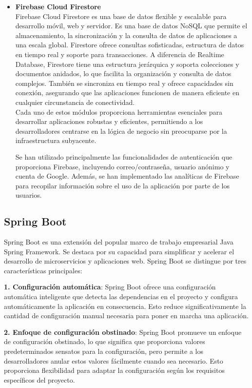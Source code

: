 \documentclass[12pt,twoside,titlepage]{report}
\begin{document}
\begin{itemize}
\item \textbf{Firebase Cloud Firestore} \\
Firebase Cloud Firestore es una base de datos flexible y escalable para desarrollo móvil, web y servidor. Es una base de datos NoSQL que permite el almacenamiento, la sincronización y la consulta de datos de aplicaciones a una escala global. Firestore ofrece consultas sofisticadas, estructura de datos en tiempo real y soporte para transacciones. A diferencia de Realtime Database, Firestore tiene una estructura jerárquica y soporta colecciones y documentos anidados, lo que facilita la organización y consulta de datos complejos. También se sincroniza en tiempo real y ofrece capacidades sin conexión, asegurando que las aplicaciones funcionen de manera eficiente en cualquier circunstancia de conectividad. \\

Cada uno de estos módulos proporciona herramientas esenciales para desarrollar aplicaciones robustas y eficientes, permitiendo a los desarrolladores centrarse en la lógica de negocio sin preocuparse por la infraestructura subyacente.

Se han utilizado principalmente las funcionalidades de autenticación que proporciona Firebase, incluyendo correo/contraseña, usuario anónimo y cuenta de Google. Además, se han implementado las analíticas de Firebase para recopilar información sobre el uso de la aplicación por parte de los usuarios.

\end{itemize}

\subsection{Spring Boot}
\label{sec:Springboot}

Spring Boot \cite{springboot-ibm} \cite{springboot-baeldung} es una extensión del popular marco de trabajo empresarial Java Spring Framework. Se destaca por su capacidad para simplificar y acelerar el desarrollo de microservicios y aplicaciones web. Spring Boot se distingue por tres características principales:

\textbf{1. Configuración automática}: Spring Boot ofrece una configuración automática inteligente que detecta las dependencias en el proyecto y configura automáticamente la aplicación en consecuencia. Esto reduce significativamente la cantidad de configuración manual necesaria para poner en marcha una aplicación.

\textbf{2. Enfoque de configuración obstinado}: Spring Boot promueve un enfoque de configuración obstinado, lo que significa que proporciona valores predeterminados sensatos para la configuración, pero permite a los desarrolladores anular estos valores fácilmente cuando sea necesario. Esto proporciona flexibilidad para adaptar la configuración según los requisitos específicos del proyecto.
\end{document}
